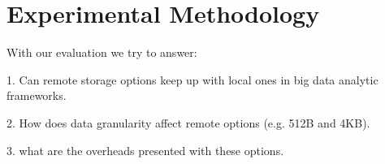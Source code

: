 \section{Experimental Methodology}
With our evaluation we try to answer: 

1. Can remote storage options keep up with local ones in big data analytic
    frameworks.

2. How does data granularity affect remote options (e.g. 512B and 4KB).

3. what are the overheads presented with these options.

\vspace{1em}

